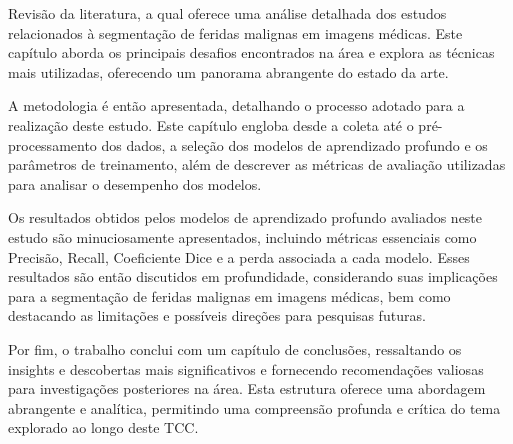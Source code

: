 Revisão da literatura, a qual oferece uma análise detalhada dos estudos relacionados à segmentação de feridas malignas em imagens médicas. Este capítulo aborda os principais desafios encontrados na área e explora as técnicas mais utilizadas, oferecendo um panorama abrangente do estado da arte.

A metodologia é então apresentada, detalhando o processo adotado para a realização deste estudo. Este capítulo engloba desde a coleta até o pré-processamento dos dados, a seleção dos modelos de aprendizado profundo e os parâmetros de treinamento, além de descrever as métricas de avaliação utilizadas para analisar o desempenho dos modelos.

Os resultados obtidos pelos modelos de aprendizado profundo avaliados neste estudo são minuciosamente apresentados, incluindo métricas essenciais como Precisão, Recall, Coeficiente Dice e a perda associada a cada modelo. Esses resultados são então discutidos em profundidade, considerando suas implicações para a segmentação de feridas malignas em imagens médicas, bem como destacando as limitações e possíveis direções para pesquisas futuras.

Por fim, o trabalho conclui com um capítulo de conclusões, ressaltando os insights e descobertas mais significativos e fornecendo recomendações valiosas para investigações posteriores na área. Esta estrutura oferece uma abordagem abrangente e analítica, permitindo uma compreensão profunda e crítica do tema explorado ao longo deste TCC.